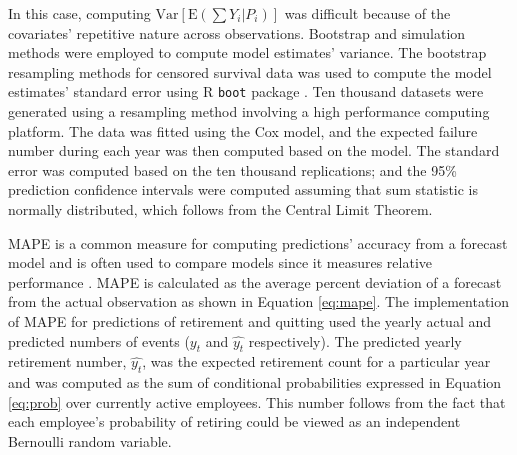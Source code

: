 In this case,  computing $\mathrm{Var}[\mathrm{E}(\sum{Y_i|P_i})]$ was difficult because of the covariates' repetitive nature across observations. Bootstrap and simulation methods were employed to compute model estimates' variance. The bootstrap resampling methods for censored survival data was used to compute the model estimates' standard error using R {\tt boot} package \citep{davison1997}. 
Ten thousand datasets were generated using a resampling method involving a high performance computing platform. The data was fitted using the Cox model, and the expected failure number during each year was then computed based on the model. The standard error was computed based on the ten thousand replications; and the 95\% prediction confidence intervals were computed assuming that sum statistic is normally distributed, which follows from the Central Limit Theorem.

MAPE is a common measure for computing predictions' accuracy from a forecast model and is often used to compare models since it measures relative performance \citep{Chu1998}. MAPE is calculated as the average percent deviation of a forecast from the actual observation as shown in Equation \ref{eq:mape}.
The implementation of MAPE for predictions of retirement and quitting used the yearly actual and predicted numbers of events ($y_t$ and $\hat{y_t}$ respectively). The predicted yearly retirement number, $\hat{y_t}$,  was the expected retirement count for a particular year and was computed as the sum of conditional probabilities expressed in Equation \ref{eq:prob} over currently active employees. This number follows from the fact that each employee's probability of retiring could be viewed as an independent Bernoulli random variable.


